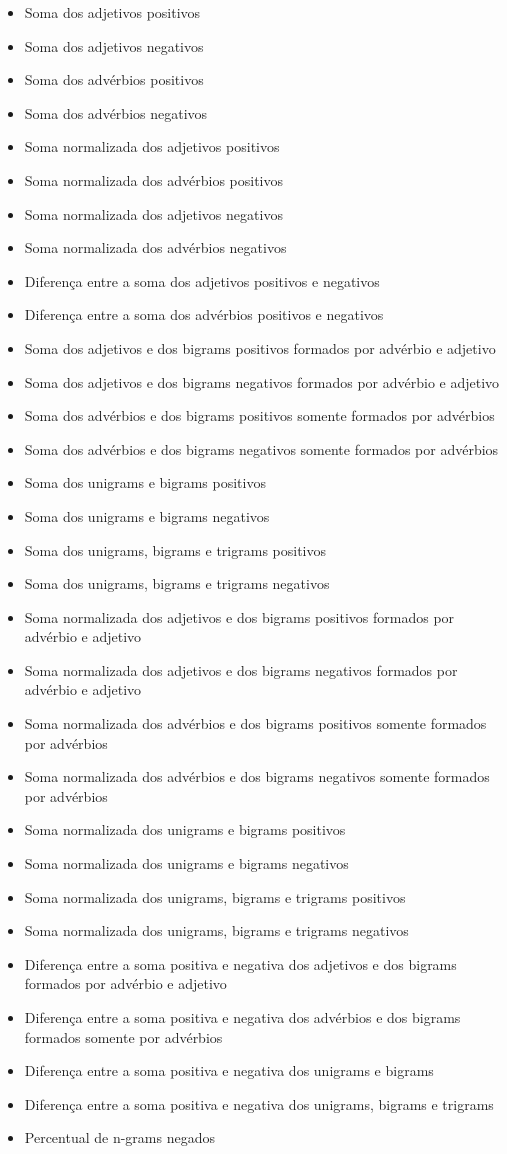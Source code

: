 \begin{itemize}
\item Soma dos adjetivos positivos
\item Soma dos adjetivos negativos
\item Soma dos advérbios positivos
\item Soma dos advérbios negativos
\item Soma normalizada dos adjetivos positivos
\item Soma normalizada dos advérbios positivos
\item Soma normalizada dos adjetivos negativos
\item Soma normalizada dos advérbios negativos
\item Diferença entre a soma dos adjetivos positivos e negativos
\item Diferença entre a soma dos advérbios positivos e negativos
\item Soma dos adjetivos e dos bigrams positivos formados por advérbio e adjetivo
\item Soma dos adjetivos e dos bigrams negativos formados por advérbio e adjetivo
\item Soma dos advérbios e dos bigrams positivos somente formados por advérbios
\item Soma dos advérbios e dos bigrams negativos somente formados por advérbios
\item Soma dos unigrams e bigrams positivos
\item Soma dos unigrams e bigrams negativos
\item Soma dos unigrams, bigrams e trigrams positivos
\item Soma dos unigrams, bigrams e trigrams negativos
\item Soma normalizada dos adjetivos e dos bigrams positivos formados por advérbio e adjetivo
\item Soma normalizada dos adjetivos e dos bigrams negativos formados por advérbio e adjetivo
\item Soma normalizada dos advérbios e dos bigrams positivos somente formados por advérbios
\item Soma normalizada dos advérbios e dos bigrams negativos somente formados por advérbios
\item Soma normalizada dos unigrams e bigrams positivos
\item Soma normalizada dos unigrams e bigrams negativos
\item Soma normalizada dos unigrams, bigrams e trigrams positivos
\item Soma normalizada dos unigrams, bigrams e trigrams negativos
\item Diferença entre a soma positiva e negativa dos adjetivos e dos bigrams formados por advérbio e adjetivo
\item Diferença entre a soma positiva e negativa dos advérbios e dos bigrams formados somente por advérbios
\item Diferença entre a soma positiva e negativa dos unigrams e bigrams
\item Diferença entre a soma positiva e negativa dos unigrams, bigrams e trigrams
\item Percentual de n-grams negados
\end{itemize}

